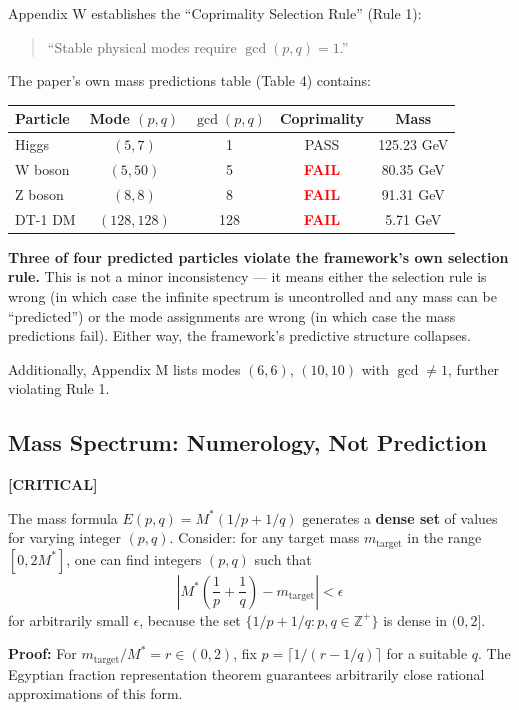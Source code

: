 \documentclass[12pt, a4paper]{article}
\newcommand{\severity}[1]{\textcolor{critical}{\textbf{[CRITICAL]}}}
\begin{document}
Appendix W establishes the ``Coprimality Selection Rule'' (Rule 1):
\begin{quote}
    ``Stable physical modes require $\gcd(p, q) = 1$.''
\end{quote}

The paper's own mass predictions table (Table 4) contains:
\begin{center}
\begin{tabular}{lcccc}
\toprule
Particle & Mode $(p, q)$ & $\gcd(p,q)$ & Coprimality & Mass \\
\midrule
Higgs & $(5, 7)$ & 1 & PASS & 125.23 GeV \\
W boson & $(5, 50)$ & 5 & \textcolor{red}{\textbf{FAIL}} & 80.35 GeV \\
Z boson & $(8, 8)$ & 8 & \textcolor{red}{\textbf{FAIL}} & 91.31 GeV \\
DT-1 DM & $(128, 128)$ & 128 & \textcolor{red}{\textbf{FAIL}} & 5.71 GeV \\
\bottomrule
\end{tabular}
\end{center}

\textbf{Three of four predicted particles violate the framework's own selection rule.} This is not a minor inconsistency --- it means either the selection rule is wrong (in which case the infinite spectrum is uncontrolled and any mass can be ``predicted'') or the mode assignments are wrong (in which case the mass predictions fail). Either way, the framework's predictive structure collapses.

Additionally, Appendix M lists modes $(6,6)$, $(10,10)$ with $\gcd \neq 1$, further violating Rule 1.

\subsection{Mass Spectrum: Numerology, Not Prediction}
\severity{C3}

The mass formula $E(p,q) = M^*(1/p + 1/q)$ generates a \textbf{dense set} of values for varying integer $(p,q)$. Consider: for any target mass $m_{\text{target}}$ in the range $[0, 2M^*]$, one can find integers $(p,q)$ such that
\begin{equation}
    \left| M^*\left(\frac{1}{p} + \frac{1}{q}\right) - m_{\text{target}} \right| < \epsilon
\end{equation}
for arbitrarily small $\epsilon$, because the set $\{1/p + 1/q : p, q \in \mathbb{Z}^+\}$ is dense in $(0, 2]$.

\textbf{Proof:} For $m_{\text{target}} / M^* = r \in (0, 2)$, fix $p = \lceil 1/(r - 1/q) \rceil$ for a suitable $q$. The Egyptian fraction representation theorem guarantees arbitrarily close rational approximations of this form.
\end{document}
